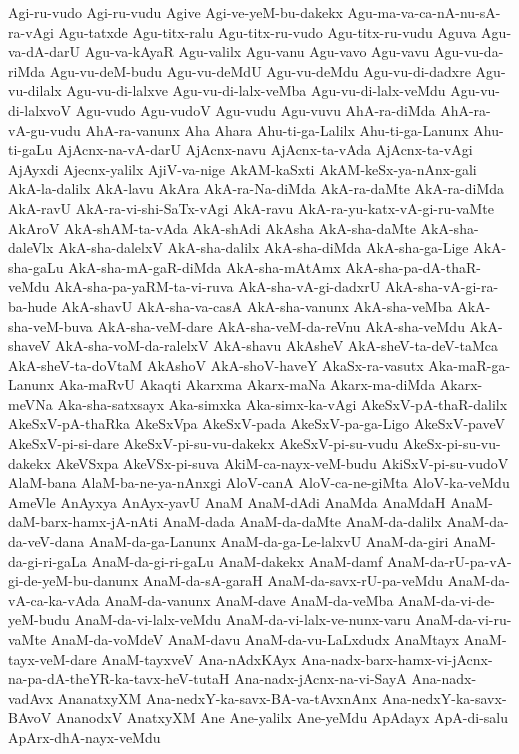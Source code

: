 {Agi-ru-vudo
Agi-ru-vudu
Agive
Agi-ve-yeM-bu-dakekx
Agu-ma-va-ca-nA-nu-sA-ra-vAgi
Agu-tatxde
Agu-titx-ralu
Agu-titx-ru-vudo
Agu-titx-ru-vudu
Aguva
Agu-va-dA-darU
Agu-va-kAyaR
Agu-valilx
Agu-vanu
Agu-vavo
Agu-vavu
Agu-vu-da-riMda
Agu-vu-deM-budu
Agu-vu-deMdU
Agu-vu-deMdu
Agu-vu-di-dadxre
Agu-vu-dilalx
Agu-vu-di-lalxve
Agu-vu-di-lalx-veMba
Agu-vu-di-lalx-veMdu
Agu-vu-di-lalxvoV
Agu-vudo
Agu-vudoV
Agu-vudu
Agu-vuvu
AhA-ra-diMda
AhA-ra-vA-gu-vudu
AhA-ra-vanunx
Aha
Ahara
Ahu-ti-ga-Lalilx
Ahu-ti-ga-Lanunx
Ahu-ti-gaLu
AjAcnx-na-vA-darU
AjAcnx-navu
AjAcnx-ta-vAda
AjAcnx-ta-vAgi
AjAyxdi
Ajecnx-yalilx
AjiV-va-nige
AkAM-kaSxti
AkAM-keSx-ya-nAnx-gali
AkA-la-dalilx
AkA-lavu
AkAra
AkA-ra-Na-diMda
AkA-ra-daMte
AkA-ra-diMda
AkA-ravU
AkA-ra-vi-shi-SaTx-vAgi
AkA-ravu
AkA-ra-yu-katx-vA-gi-ru-vaMte
AkAroV
AkA-shAM-ta-vAda
AkA-shAdi
AkAsha
AkA-sha-daMte
AkA-sha-daleVlx
AkA-sha-dalelxV
AkA-sha-dalilx
AkA-sha-diMda
AkA-sha-ga-Lige
AkA-sha-gaLu
AkA-sha-mA-gaR-diMda
AkA-sha-mAtAmx
AkA-sha-pa-dA-thaR-veMdu
AkA-sha-pa-yaRM-ta-vi-ruva
AkA-sha-vA-gi-dadxrU
AkA-sha-vA-gi-ra-ba-hude
AkA-shavU
AkA-sha-va-casA
AkA-sha-vanunx
AkA-sha-veMba
AkA-sha-veM-buva
AkA-sha-veM-dare
AkA-sha-veM-da-reVnu
AkA-sha-veMdu
AkA-shaveV
AkA-sha-voM-da-ralelxV
AkA-shavu
AkAsheV
AkA-sheV-ta-deV-taMca
AkA-sheV-ta-doVtaM
AkAshoV
AkA-shoV-haveY
AkaSx-ra-vasutx
Aka-maR-ga-Lanunx
Aka-maRvU
Akaqti
Akarxma
Akarx-maNa
Akarx-ma-diMda
Akarx-meVNa
Aka-sha-satxsayx
Aka-simxka
Aka-simx-ka-vAgi
AkeSxV-pA-thaR-dalilx
AkeSxV-pA-thaRka
AkeSxVpa
AkeSxV-pada
AkeSxV-pa-ga-Ligo
AkeSxV-paveV
AkeSxV-pi-si-dare
AkeSxV-pi-su-vu-dakekx
AkeSxV-pi-su-vudu
AkeSx-pi-su-vu-dakekx
AkeVSxpa
AkeVSx-pi-suva
AkiM-ca-nayx-veM-budu
AkiSxV-pi-su-vudoV
AlaM-bana
AlaM-ba-ne-ya-nAnxgi
AloV-canA
AloV-ca-ne-giMta
AloV-ka-veMdu
AmeVle
AnAyxya
AnAyx-yavU
AnaM
AnaM-dAdi
AnaMda
AnaMdaH
AnaM-daM-barx-hamx-jA-nAti
AnaM-dada
AnaM-da-daMte
AnaM-da-dalilx
AnaM-da-da-veV-dana
AnaM-da-ga-Lanunx
AnaM-da-ga-Le-lalxvU
AnaM-da-giri
AnaM-da-gi-ri-gaLa
AnaM-da-gi-ri-gaLu
AnaM-dakekx
AnaM-damf
AnaM-da-rU-pa-vA-gi-de-yeM-bu-danunx
AnaM-da-sA-garaH
AnaM-da-savx-rU-pa-veMdu
AnaM-da-vA-ca-ka-vAda
AnaM-da-vanunx
AnaM-dave
AnaM-da-veMba
AnaM-da-vi-de-yeM-budu
AnaM-da-vi-lalx-veMdu
AnaM-da-vi-lalx-ve-nunx-varu
AnaM-da-vi-ru-vaMte
AnaM-da-voMdeV
AnaM-davu
AnaM-da-vu-LaLxdudx
AnaMtayx
AnaM-tayx-veM-dare
AnaM-tayxveV
Ana-nAdxKAyx
Ana-nadx-barx-hamx-vi-jAcnx-na-pa-dA-theYR-ka-tavx-heV-tutaH
Ana-nadx-jAcnx-na-vi-SayA
Ana-nadx-vadAvx
AnanatxyXM
Ana-nedxY-ka-savx-BA-va-tAvxnAnx
Ana-nedxY-ka-savx-BAvoV
AnanodxV
AnatxyXM
Ane
Ane-yalilx
Ane-yeMdu
ApAdayx
ApA-di-salu
ApArx-dhA-nayx-veMdu
}
